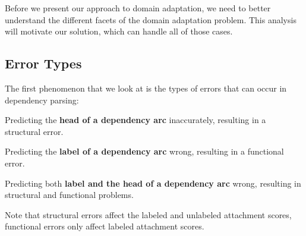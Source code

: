 

Before we present our approach to domain adaptation, we need to better understand the different facets of the domain adaptation problem. This analysis will motivate our solution, which can handle all of those cases.

\subsection{Error Types}

The first phenomenon that we look at is the types of errors that can occur in dependency parsing:

\begin{compactenum}
    \item Predicting the \textbf{head of a dependency arc} inaccurately, resulting in a structural error. %
    \item Predicting the \textbf{label of a dependency arc} wrong, resulting in a functional error. %
    \item Predicting both \textbf{label and the head of a dependency arc} wrong, resulting in structural and functional problems.
\end{compactenum}

Note that structural errors affect the labeled and unlabeled attachment scores, functional errors only affect labeled attachment scores.


